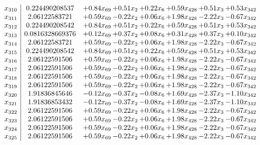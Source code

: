 \documentclass[8pt]{article}
\begin{document}
\[\begin{array}{c| c c@{\hskip 2pt} c@{\hskip 2pt} c@{\hskip 2pt} c@{\hskip 2pt} c@{\hskip 2pt} c@{\hskip 2pt} }
 x_{310}   &  0.224490208537 & +  0.84 x_{69} & +  0.51 x_{2} & +  0.22 x_{6} & +  0.59 x_{428} & +  0.51 x_{3} & +  0.53 x_{342}\\
 x_{311}   &  2.06122583721 & +  0.59 x_{69} & -0.22 x_{2} & +  0.06 x_{6} & +  1.98 x_{428} & -2.22 x_{3} & -0.67 x_{342}\\
 x_{312}   &  0.224490208542 & +  0.84 x_{69} & +  0.51 x_{2} & +  0.22 x_{6} & +  0.59 x_{428} & +  0.51 x_{3} & +  0.53 x_{342}\\
 x_{313}   &  0.0816328669376 & +  0.12 x_{69} & +  0.37 x_{2} & +  0.08 x_{6} & +  0.31 x_{428} & +  0.37 x_{3} & +  0.10 x_{342}\\
 x_{314}   &  2.06122583721 & +  0.59 x_{69} & -0.22 x_{2} & +  0.06 x_{6} & +  1.98 x_{428} & -2.22 x_{3} & -0.67 x_{342}\\
 x_{315}   &  0.224490208542 & +  0.84 x_{69} & +  0.51 x_{2} & +  0.22 x_{6} & +  0.59 x_{428} & +  0.51 x_{3} & +  0.53 x_{342}\\
 x_{316}   &  2.06122591506 & +  0.59 x_{69} & -0.22 x_{2} & +  0.06 x_{6} & +  1.98 x_{428} & -2.22 x_{3} & -0.67 x_{342}\\
 x_{317}   &  2.06122591506 & +  0.59 x_{69} & -0.22 x_{2} & +  0.06 x_{6} & +  1.98 x_{428} & -2.22 x_{3} & -0.67 x_{342}\\
 x_{318}   &  2.06122591506 & +  0.59 x_{69} & -0.22 x_{2} & +  0.06 x_{6} & +  1.98 x_{428} & -2.22 x_{3} & -0.67 x_{342}\\
 x_{319}   &  2.06122591506 & +  0.59 x_{69} & -0.22 x_{2} & +  0.06 x_{6} & +  1.98 x_{428} & -2.22 x_{3} & -0.67 x_{342}\\
 x_{320}   &  1.91836845646 & -0.12 x_{69} & -0.37 x_{2} & -0.08 x_{6} & +  1.69 x_{428} & -2.37 x_{3} & -1.10 x_{342}\\
 x_{321}   &  1.91836853432 & -0.12 x_{69} & -0.37 x_{2} & -0.08 x_{6} & +  1.69 x_{428} & -2.37 x_{3} & -1.10 x_{342}\\
 x_{322}   &  2.06122591506 & +  0.59 x_{69} & -0.22 x_{2} & +  0.06 x_{6} & +  1.98 x_{428} & -2.22 x_{3} & -0.67 x_{342}\\
 x_{323}   &  2.06122591506 & +  0.59 x_{69} & -0.22 x_{2} & +  0.06 x_{6} & +  1.98 x_{428} & -2.22 x_{3} & -0.67 x_{342}\\
 x_{324}   &  2.06122591506 & +  0.59 x_{69} & -0.22 x_{2} & +  0.06 x_{6} & +  1.98 x_{428} & -2.22 x_{3} & -0.67 x_{342}\\
 x_{325}   &  2.06122591506 & +  0.59 x_{69} & -0.22 x_{2} & +  0.06 x_{6} & +  1.98 x_{428} & -2.22 x_{3} & -0.67 x_{342}\\

\end{array}\]
\end{document}
